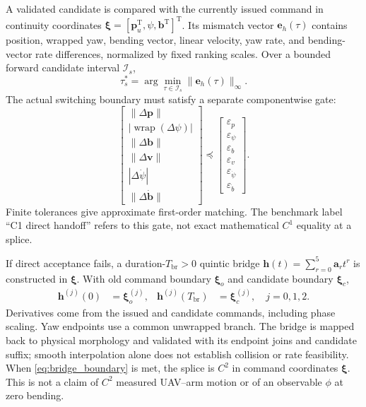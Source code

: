 \documentclass[journal,twoside]{IEEEtran}
\newcommand{\wrap}{\operatorname{wrap}}
\begin{document}
A validated candidate is compared with the currently issued command in continuity coordinates $\boldsymbol\xi=[\mathbf p_u^{\mathrm T},\psi,\mathbf b^{\mathrm T}]^{\mathrm T}$. Its mismatch vector $\mathbf e_h(\tau)$ contains position, wrapped yaw, bending vector, linear velocity, yaw rate, and bending-vector rate differences, normalized by fixed ranking scales. Over a bounded forward candidate interval $\mathcal I_s$,
\begin{equation}
\tau_s^*=\arg\min_{\tau\in\mathcal I_s}\|\mathbf e_h(\tau)\|_\infty.
\label{eq:phase_match}
\end{equation}
The actual switching boundary must satisfy a separate componentwise gate:
\begin{equation}
\begin{bmatrix}
\|\Delta\mathbf p\|\\|\wrap(\Delta\psi)|\\\|\Delta\mathbf b\|\\
\|\Delta\mathbf v\|\\|\Delta\dot\psi|\\\|\Delta\dot{\mathbf b}\|
\end{bmatrix}
\preceq
\begin{bmatrix}
\varepsilon_p\\\varepsilon_\psi\\\varepsilon_b\\
\varepsilon_v\\\varepsilon_{\dot\psi}\\\varepsilon_{\dot b}
\end{bmatrix}.
\label{eq:handoff_gate}
\end{equation}
Finite tolerances give approximate first-order matching. The benchmark label ``C1 direct handoff'' refers to this gate, not exact mathematical $C^1$ equality at a splice.

If direct acceptance fails, a duration-$T_{\mathrm{br}}>0$ quintic bridge $\mathbf h(t)=\sum_{r=0}^{5}\mathbf a_rt^r$ is constructed in $\boldsymbol\xi$. With old command boundary $\boldsymbol\xi_o$ and candidate boundary $\boldsymbol\xi_c$,
\begin{equation}
\begin{aligned}
\mathbf h^{(j)}(0)&=\boldsymbol\xi_o^{(j)},&
\mathbf h^{(j)}(T_{\mathrm{br}})&=\boldsymbol\xi_c^{(j)},\quad j=0,1,2.
\end{aligned}
\label{eq:bridge_boundary}
\end{equation}
Derivatives come from the issued and candidate commands, including phase scaling. Yaw endpoints use a common unwrapped branch. The bridge is mapped back to physical morphology and validated with its endpoint joins and candidate suffix; smooth interpolation alone does not establish collision or rate feasibility. When \eqref{eq:bridge_boundary} is met, the splice is $C^2$ in command coordinates $\boldsymbol\xi$. This is not a claim of $C^2$ measured UAV--arm motion or of an observable $\phi$ at zero bending.
\end{document}
